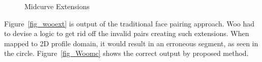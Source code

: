 \begin{enumerate}

\begin{figure}[h!]
\centering     %
{} \quad
{} \quad
\caption{Midcurve Extensions}
  \label{fig:midsurfcelljoin:Woomc}
\end{figure}


Figure~\ref{fig_wooext} is output of the traditional face pairing approach. Woo had to devise a logic to get rid off the invalid pairs creating such extensions. When mapped to 2D profile domain, it would result in an erroneous segment, as seen in the circle. Figure~\ref{fig_Woomc} shows the correct output by proposed method.


%
\end{enumerate}


